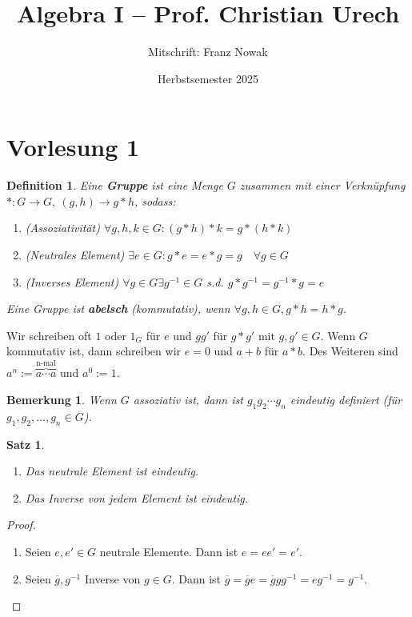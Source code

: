 \documentclass{article}
\title{Algebra I -- {Prof. Christian Urech}}
\author{Mitschrift: Franz Nowak}
\date{Herbstsemester 2025}
\theoremstyle{plain}
\newtheorem{definition}{Definition}
\newtheorem{theorem}{Satz}
\newtheorem{bemerkung}{Bemerkung}
\newcommand{\defn}[1]{\textbf{#1}}
\begin{document}
\maketitle

\section*{Vorlesung 1}
\begin{definition}
    Eine \defn{Gruppe} ist eine Menge $G$ zusammen mit einer Verknüpfung $*\colon G\to G, \ (g, h) \to g * h$, sodass:
    \begin{enumerate}[label=(\arabic*)]
        \item (Assoziativität) $\forall g,h,k\in G\colon (g*h)*k=g*(h*k)$
        \item (Neutrales Element) $\exists e\in G\colon g*e=e*g=g \quad \forall g\in G$
        \item (Inverses Element) $\forall g\in G \exists g^{-1}\in G$ s.d. $g*g^{-1}=g^{-1}*g=e$
    \end{enumerate}
    Eine Gruppe ist \defn{abelsch} (kommutativ), wenn $\forall g, h\in G, g*h=h*g$.
\end{definition}
Wir schreiben oft $1$ oder $1_G$ für $e$ und $gg'$ für $g*g'$ mit $g,g'\in G$. Wenn $G$ kommutativ ist, dann schreiben wir $e=0$ und $a + b$ für $a * b$. Des Weiteren sind $a^n := \overbrace{a \cdots a}^{\text{n-mal}}$ und $a^0:=1$.

\begin{bemerkung}
    Wenn $G$ assoziativ ist, dann ist $g_1g_2\cdots g_n$ eindeutig definiert (für $g_1,g_2,\ldots,g_n\in G$).
\end{bemerkung}
\begin{theorem}
    \begin{enumerate}[label=(\alph*)]
        \item Das neutrale Element ist eindeutig.
        \item Das Inverse von jedem Element ist eindeutig.
    \end{enumerate}
\end{theorem}
\begin{proof}
    \begin{enumerate}[label=(\alph*)]
        \item Seien $e, e'\in G$ neutrale Elemente. Dann ist $e=ee'=e'$.
        \item Seien $\overline{g}, g^{-1}$ Inverse von $g\in G$. Dann ist $\overline{g}=\overline{g}e=\overline{g}gg^{-1}=eg^{-1}=g^{-1}$.
    \end{enumerate}
\end{proof}
\end{document}
